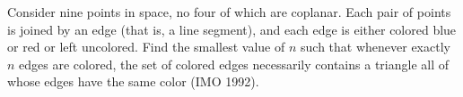 Consider nine points in space, no four of which are coplanar. Each pair of points is joined by an edge (that is, a line segment), and each edge is either colored blue or red or left uncolored. Find the smallest value of $n$ such that whenever exactly $n$ edges are colored, the set of colored edges necessarily contains a triangle all of whose edges have the same color (IMO 1992).
